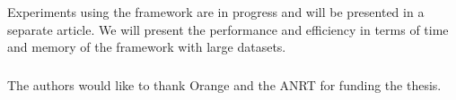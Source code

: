 \documentclass{llncs}
\begin{document}
Experiments using the framework are in progress and will be presented in a separate article.
We will present the performance and efficiency in terms of time and memory of the framework with large datasets.


\begin{credits}
\subsubsection{\ackname} The authors would like to thank Orange and the ANRT for funding the thesis.
\end{credits}



\end{document}
